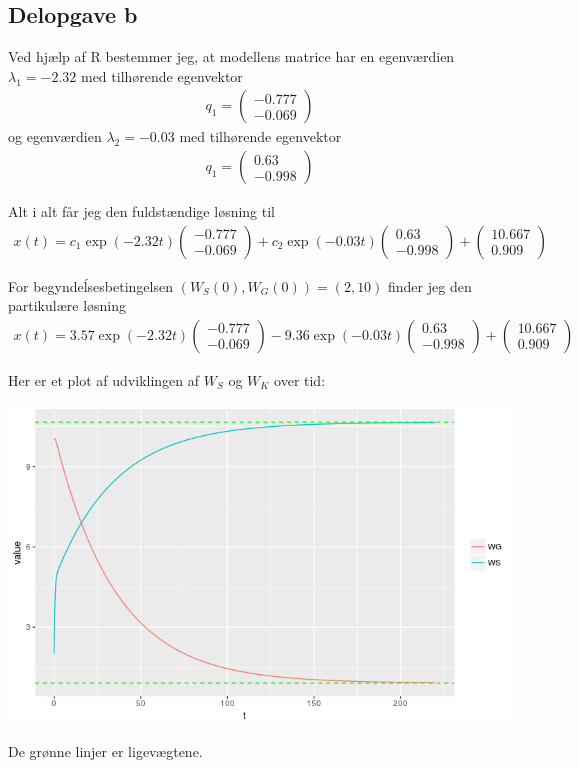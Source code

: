 \documentclass[12pt]{article}
\begin{document}
\subsection{Delopgave b}

Ved hjælp af R bestemmer jeg, at modellens matrice har en egenværdien $\lambda_1=-2.32$ med tilhørende egenvektor 
\begin{align}
q_1 = \begin{pmatrix}
-0.777 \\ -0.069
\end{pmatrix}
\end{align}
og egenværdien $\lambda_2=-0.03$ med tilhørende egenvektor
\begin{align}
q_1 = \begin{pmatrix}
0.63 \\ -0.998
\end{pmatrix}
\end{align}

Alt i alt får jeg den fuldstændige løsning til
\begin{align}
x(t) = c_1\exp(-2.32t)\begin{pmatrix}
-0.777 \\ -0.069
\end{pmatrix} + c_2\exp(-0.03t)\begin{pmatrix}
0.63 \\ -0.998
\end{pmatrix} + \begin{pmatrix}
10.667 \\ 0.909
\end{pmatrix}
\end{align}

For begyndeĺsesbetingelsen $(W_S(0), W_G(0))=(2,10)$ finder jeg den partikulære løsning
\begin{align}
x(t) = 3.57\exp(-2.32t)\begin{pmatrix}
-0.777 \\ -0.069
\end{pmatrix} - 9.36\exp(-0.03t)\begin{pmatrix}
0.63 \\ -0.998
\end{pmatrix} + \begin{pmatrix}
10.667 \\ 0.909
\end{pmatrix}
\end{align}

Her er et plot af udviklingen af $W_S$ og $W_K$ over tid:
\begin{center}
\includegraphics[scale=0.5]{q3p1.png}
\end{center}
De grønne linjer er ligevægtene.
\end{document}
